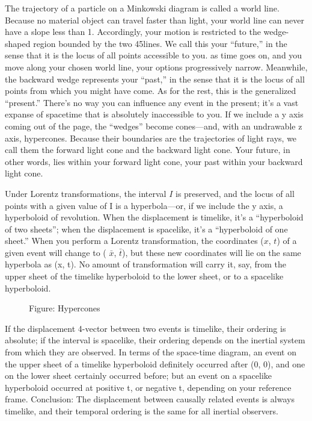 \documentclass[../../../main.tex]{subfiles}
\begin{document}
The trajectory of a particle on a Minkowski diagram is called a world line. Because no material object can travel faster than light, your world line can never have a slope less than 1. Accordingly, your motion is restricted to the wedge-shaped region bounded by the two 45\textdegree lines. We call this your “future,” in the sense that it is the locus of all points accessible to you. as time goes on, and you move along your chosen world line, your options progressively narrow. Meanwhile, the backward wedge represents your “past,” in the sense that it is the locus of all points from which you might have come. As for the rest, this is the generalized “present.” There's no way you can influence any event in the present; it's a vast expanse of spacetime that is absolutely inaccessible to you. If we include a y axis coming out of the page, the “wedges” become cones—and, with an undrawable z axis, hypercones. Because their boundaries are the trajectories of light rays, we call them the forward light cone and the backward light cone. Your future, in other words, lies within your forward light cone, your past within your backward light cone.

Under Lorentz transformations, the interval $I$ is preserved, and the locus of all points with a given value of I is a hyperbola—or, if we include the y axis, a hyperboloid of revolution. When the displacement is timelike, it's a “hyperboloid of two sheets”; when the displacement is spacelike, it's a “hyperboloid of one sheet.” When you perform a Lorentz transformation, the coordinates ($x$, $t$) of a given event will change to ( $\bar{x}$, $\bar{t}$), but these new coordinates will lie on the same hyperbola as (x, t). No amount of transformation will carry it, say, from the upper sheet of the timelike hyperboloid to the lower sheet, or to a spacelike hyperboloid.
\begin{figure}
    \centering
    \caption*{Figure: Hypercones}
\end{figure}

If the displacement 4-vector between two events is timelike, their ordering is absolute; if the interval is spacelike, their ordering depends on the inertial system from which they are observed. In terms of the space-time diagram, an event on the upper sheet of a timelike hyperboloid definitely occurred after (0, 0), and one on the lower sheet certainly occurred before; but an event on a spacelike hyperboloid occurred at positive t, or negative t, depending on your reference frame. Conclusion: The displacement between causally related events is always timelike, and their temporal ordering is the same for all inertial observers.
\end{document}
